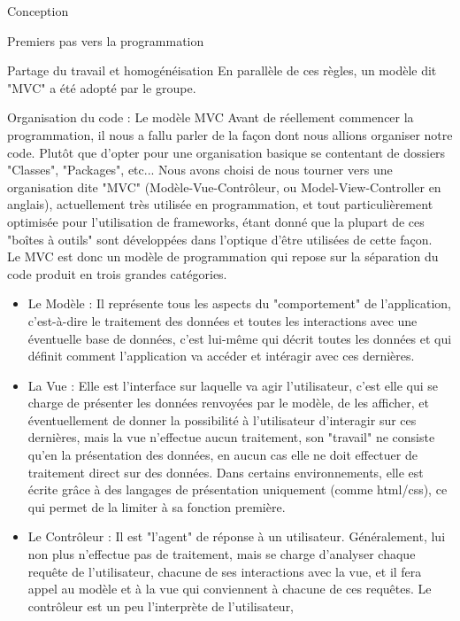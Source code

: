 \documentclass[a4paper, 12pt]{report}
\begin{document}
\begin{part}{Conception}
\begin{chapter}{Premiers pas vers la programmation}
\begin{section}{Partage du travail et homogénéisation}
				En parallèle de ces règles, un modèle dit "MVC" a été adopté par le groupe.\\
			\end{section}
			\begin{section}{Organisation du code : Le modèle MVC}
				Avant de réellement commencer la programmation, il nous a fallu parler de la façon dont nous allions organiser notre code.
				Plutôt que d'opter pour une organisation basique se contentant de dossiers "Classes", "Packages", etc... Nous avons choisi de 
				nous tourner vers une organisation dite "MVC" (Modèle-Vue-Contrôleur, ou Model-View-Controller en anglais), actuellement très 
				utilisée en programmation, et tout particulièrement optimisée pour l'utilisation de frameworks, étant donné que la plupart de 
				ces "boîtes à outils" sont développées dans l'optique d'être utilisées de cette façon.\\
				Le MVC est donc un modèle de programmation qui repose sur la séparation du code produit en trois grandes catégories.\\
				\begin{itemize}
					\item Le Modèle : Il représente tous les aspects du "comportement" de l'application, c'est-à-dire le traitement des données
					et toutes les interactions avec une éventuelle base de données, c'est lui-même qui décrit toutes les données et qui 
					définit comment l'application va accéder et intéragir avec ces dernières.
					\item La Vue : Elle est l'interface sur laquelle va agir l'utilisateur, c'est elle qui se charge de présenter les données
					renvoyées par le modèle, de les afficher, et éventuellement de donner la possibilité à l'utilisateur d'interagir sur 
					ces dernières, mais la vue n'effectue aucun traitement, son "travail" ne consiste qu'en la présentation des données, 
					en aucun cas elle ne doit effectuer de traitement direct sur des données. Dans certains environnements, elle est écrite 
					grâce à des langages de présentation uniquement (comme html/css), ce qui permet de la limiter à sa fonction première.
					\item Le Contrôleur : Il est "l'agent" de réponse à un utilisateur. Généralement, lui non plus n'effectue pas de traitement,
					mais se charge d'analyser chaque requête de l'utilisateur, chacune de ses interactions avec la vue, et il fera appel
					au modèle et à la vue qui conviennent à chacune de ces requêtes. Le contrôleur est un peu l'interprète de l'utilisateur,

\end{itemize}
\end{section}
\end{chapter}
\end{part}
\end{document}
